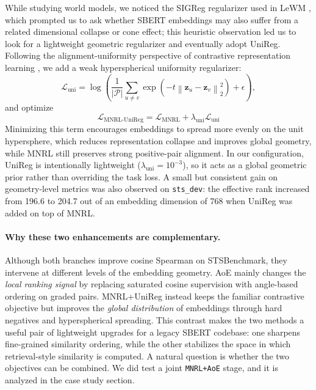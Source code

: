 \documentclass[letterpaper]{article} %
\begin{document}
While studying world models, we noticed the SIGReg regularizer used in LeWM \cite{maes2026lewm},
which prompted us to ask whether SBERT embeddings may also suffer from a related dimensional
collapse or cone effect; this heuristic observation led us to look for a lightweight geometric
regularizer and eventually adopt UniReg.
Following the alignment-uniformity perspective of contrastive representation learning
\cite{wang-isola-2020-alignment-uniformity}, we add a weak hyperspherical uniformity regularizer:
\begin{equation}
\mathcal{L}_{\text{uni}}=
\log\left(\frac{1}{|\mathcal{P}|}\sum_{u\neq v}\exp\left(-t\left\|\mathbf{z}_u-\mathbf{z}_v\right\|_2^2\right)+\epsilon\right),
\end{equation}
and optimize
\begin{equation}
\mathcal{L}_{\text{MNRL-UniReg}}=\mathcal{L}_{\text{MNRL}}+\lambda_{\text{uni}}\mathcal{L}_{\text{uni}}
\end{equation}
Minimizing this term encourages embeddings to spread more evenly on the unit hypersphere, which
reduces representation collapse and improves global geometry, while MNRL still preserves strong
positive-pair alignment. In our configuration, UniReg is intentionally lightweight
($\lambda_{\text{uni}}=10^{-3}$), so it acts as a global geometric prior rather than overriding the
task loss.
A small but consistent gain on geometry-level metrics was also observed on \texttt{sts\_dev}: the
effective rank increased from 196.6 to 204.7 out of an embedding dimension of 768 when UniReg was
added on top of MNRL.

\paragraph{Why these two enhancements are complementary.}
Although both branches improve cosine Spearman on STSBenchmark, they intervene at different levels of
the embedding geometry. AoE mainly changes the \emph{local ranking signal} by replacing saturated
cosine supervision with angle-based ordering on graded pairs. MNRL+UniReg instead keeps the familiar
contrastive objective but improves the \emph{global distribution} of embeddings through hard negatives
and hyperspherical spreading. This contrast makes the two methods a useful pair of lightweight
upgrades for a legacy SBERT codebase: one sharpens fine-grained similarity ordering, while the other
stabilizes the space in which retrieval-style similarity is computed.
A natural question is whether the two objectives can be combined. We did test a joint
\texttt{MNRL+AoE} stage, and it is analyzed in the case study section.
\end{document}

